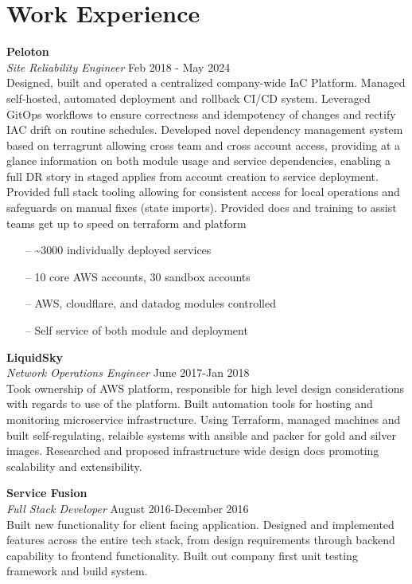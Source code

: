 \section{Work Experience}

\large{\textbf{Peloton}} \\
\textit{Site Reliability Engineer} \hfill Feb 2018 - May 2024 \\[3.75pt]
Designed, built and operated a centralized company-wide IaC Platform. Managed self-hosted, automated deployment and rollback CI/CD system. Leveraged GitOps workflows to ensure correctness and idempotency of changes and rectify IAC drift on routine schedules. Developed novel dependency management system based on terragrunt allowing cross team and cross account access, providing at a glance information on both module usage and service dependencies, enabling a full DR story in staged applies from account creation to service deployment. Provided full stack tooling allowing for consistent access for local operations and safeguards on manual fixes (state imports). Provided docs and training to assist teams get up to speed on terraform and platform


\begin{minipage}[t]{\linewidth}
    \begin{itemize}
        \item[--] \sim3000 individually deployed services
        \item[--] 10 core AWS accounts, 30 sandbox accounts
        \item[--] AWS, cloudflare, and datadog modules controlled
        \item[--] Self service of both module and deployment
    \end{itemize}
    \end{minipage}

\large{\textbf{LiquidSky}} \\
\textit{Network Operations Engineer} \hfill June 2017-Jan 2018 \\[3.75pt]
Took ownership of AWS platform, responsible for high level design considerations with regards to use of the platform. Built automation tools for hosting and monitoring microservice infrastructure. Using Terraform, managed machines and built self-regulating, relaible systems with ansible and packer for gold and silver images. Researched and proposed infrastructure wide design docs promoting scalability and extensibility.

\large{\textbf{Service Fusion}} \\
\textit{Full Stack Developer} \hfill August 2016-December 2016 \\[3.75pt]
Built new functionality for client facing application. Designed and implemented features across the entire tech stack, from design requirements through backend capability to frontend functionality. Built out company first unit testing framework and build system.

